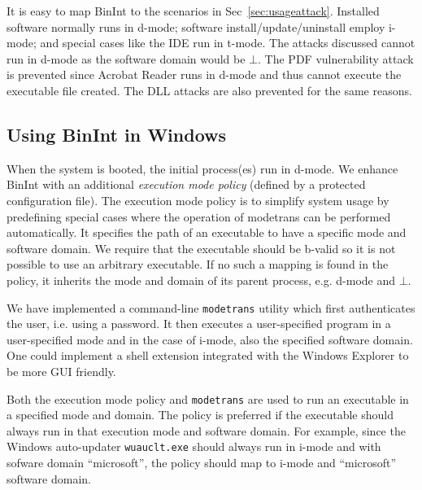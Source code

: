 It is easy to map BinInt to the scenarios in Sec~\ref{sec:usageattack}.
Installed software normally runs in d-mode;
software install/up\-date/uninstall employ i-mode;
and special cases like the IDE run in t-mode.
The attacks discussed cannot run in d-mode as the software
domain would be $\bot$.
The PDF vulnerability attack is prevented since Acrobat Reader
runs in d-mode and thus cannot execute the executable file created.
The DLL attacks are also prevented for the same reasons.

\subsection{Using BinInt in Windows}

When the system is booted, the initial process(es) run in d-mode.
We enhance  BinInt with an additional
{\em execution mode policy} (defined by a protected configuration file).
The execution mode policy is to simplify system usage by predefining
special cases where the operation of modetrans can be performed
automatically.
It specifies the path of an 
executable to have a specific mode and software domain.
We require that the executable should be b-valid so it is not possible
to use an arbitrary executable.
If no such a mapping is found in the policy, 
it inherits the mode and domain of its parent process, e.g. d-mode and $\bot$.

We have implemented a command-line {\tt modetrans} utility which
first authenticates the user, i.e. using a password.
It then executes a user-specified program in a user-specified mode and 
in the case of i-mode, also the specified software domain.
One could implement a shell extension integrated with the Windows Explorer
to be more GUI friendly.

Both the execution mode policy and {\tt modetrans} are used to run an 
executable in a specified mode and domain.
The policy is preferred if the executable should always run
in that execution mode and software domain.
For example, since the Windows auto-updater {\tt wuauclt.exe} should
always run in i-mode and with sofware domain ``microsoft'', the policy
should map 
to i-mode and ``microsoft'' software domain.
